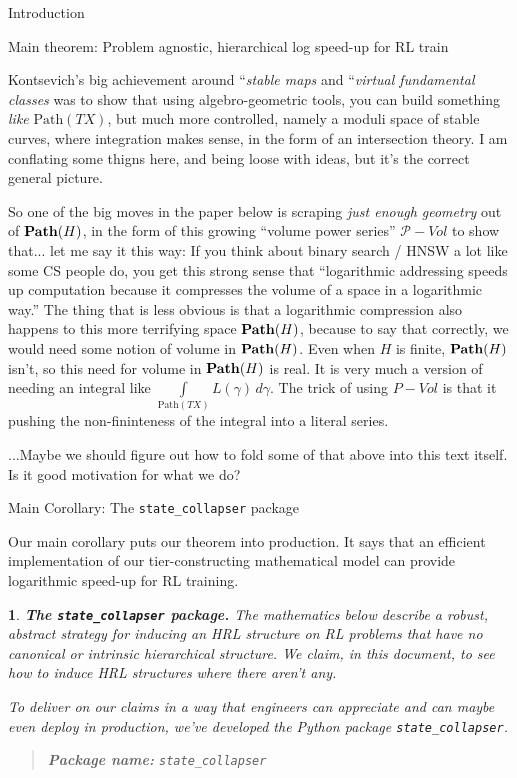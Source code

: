 \documentclass[11pt]{article}
\newtheorem{ermark}[subsubsection]{}
\begin{document}
\begin{section}{Introduction}
\begin{subsection}{Main theorem: Problem agnostic, hierarchical log speed-up for RL train}
{Kontsevich's big achievement around ``{\em stable maps} and ``{\em virtual fundamental classes} was to show that using algebro-geometric tools, you can build something {\em like} $\text{Path}(TX)$, but much more controlled, namely a moduli space of stable curves, where integration makes sense, in the form of an intersection theory. I am conflating some thigns here, and being loose with ideas, but it's the correct general picture. \cite{COGP} \cite{Katz} \cite{Kontsevich95}

So one of the big moves in the paper below is scraping {\em just enough geometry} out of $\bold{Path}(H)$, in the form of this growing ``volume power series'' $\mathcal{P}-Vol$ to show that... let me say it this way: If you think about binary search / HNSW a lot like some CS people do, you get this strong sense that ``logarithmic addressing speeds up computation because it compresses the volume of a space in a logarithmic way.'' The thing that is less obvious is that a logarithmic compression also happens to this more terrifying space $\bold{Path}(H)$, because to say that correctly, we would need some notion of volume in $\bold{Path}(H)$. Even when $H$ is finite, $\bold{Path}(H)$ isn't, so this need for volume in $\bold{Path}(H)$ is real. It is very much a version of needing an integral like $\underset{\text{Path}(TX)}{\int}\!\!\!\!\!\!L(\gamma)\,d\gamma$.  The trick of using $P-Vol$ is that it pushing the non-fininteness of the integral into a literal series.

...Maybe we should figure out how to fold some of that above into this text itself. Is it good motivation for what we do?
}

\end{subsection}

\begin{subsection}{Main Corollary: The \texttt{state\_collapser} package}

Our main corollary puts our theorem into production. It says that an efficient implementation of our tier-constructing mathematical model can provide logarithmic speed-up for RL training.

\begin{ermark}
{\bf The \texttt{state\_collapser} package.}
\normalfont
The mathematics below describe a robust, abstract strategy for inducing an HRL structure on RL problems that have no canonical or intrinsic hierarchical structure. We claim, in this document, to see how to induce HRL structures where there aren't any.

To deliver on our claims in a way that engineers can appreciate and can maybe even deploy in production, we've developed the Python package \texttt{state\_collapser}.
\begin{quote}
{\sf
\textsf{\textbf{Package name:}} \texttt{state\_collapser}

}
\end{quote}
\end{ermark}
\end{subsection}
\end{section}
\end{document}
